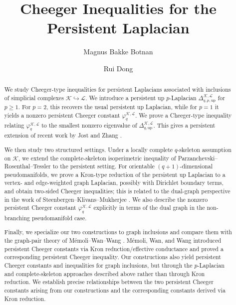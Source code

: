 \documentclass{article}
\date{} %
\title{Cheeger Inequalities for the Persistent Laplacian}
\author[1]{Magnus Bakke Botnan}
\author[1]{Rui Dong}
\affil[1]{Department of Mathematics, Vrije Universiteit Amsterdam}
\newcommand{\KK}{\mathcal{K}}
\newcommand{\LL}{\mathcal{L}}
\begin{document}
\maketitle


\begin{abstract}
We study Cheeger-type inequalities for persistent Laplacians associated with inclusions of simplicial complexes \(\KK\hookrightarrow \LL\). We introduce a persistent up \(p\)-Laplacian \(\Delta_{q,p,\mathrm{up}}^{\KK,\LL}\) for \(p\geq 1\). For \(p=2\), this recovers the usual persistent up Laplacian, while for \(p=1\) it yields a nonzero persistent Cheeger constant \(\varphi_q^{\KK,\LL}\). We prove a Cheeger-type inequality relating \(\varphi_q^{\KK,\LL}\) to the smallest nonzero eigenvalue of \(\Delta_{q,\mathrm{up}}^{\KK,\LL}\). This gives a persistent extension of recent work by Jost and Zhang \cite{jost2024cheeger}.

We then study two structured settings. Under a locally complete \(q\)-skeleton assumption on \(\KK\), we extend the complete-skeleton isoperimetric inequality of Parzanchevski--Rosenthal--Tessler \cite{MR3516884} to the persistent setting. For orientable \((q+1)\)-dimensional pseudomanifolds, we prove a Kron-type reduction of the persistent up Laplacian to a vertex- and edge-weighted graph Laplacian, possibly with Dirichlet boundary terms, and obtain two-sided Cheeger inequalities; this is related to the dual-graph perspective in the work of Steenbergen--Klivans--Mukherjee \cite{MR3194207}. We also describe the nonzero persistent Cheeger constant \(\varphi_q^{\KK,\LL}\) explicitly in terms of the dual graph in the non-branching pseudomanifold case.

Finally, we specialize our two constructions to graph inclusions and compare them with the graph-pair theory of Mémoli--Wan--Wang \cite{pers_lap}. Mémoli, Wan, and Wang introduced persistent Cheeger constants via Kron reduction/effective conductance and proved a corresponding persistent Cheeger inequality. Our constructions also yield persistent Cheeger constants and inequalities for graph inclusions, but through the $p$-Laplacian and complete-skeleton approaches described above rather than through Kron reduction. We establish precise relationships between the two persistent Cheeger constants arising from our constructions and the corresponding constants derived via Kron reduction.


\end{abstract}

\tableofcontents
\end{document}
